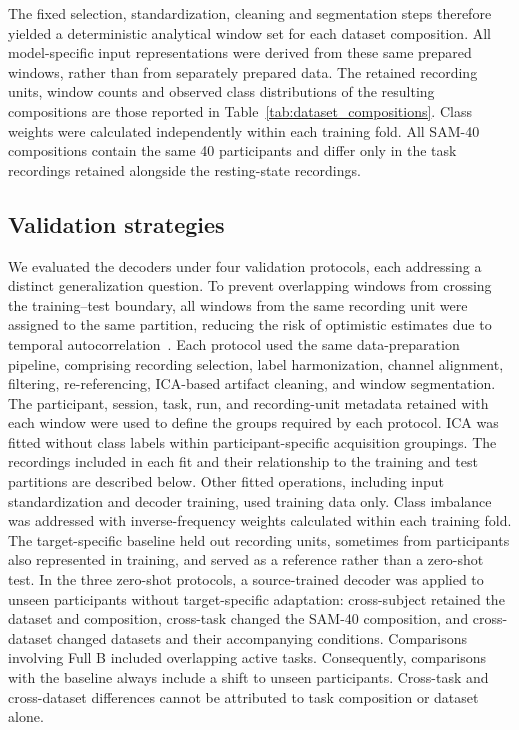 \documentclass[10pt,letterpaper]{article}
\newcommand{\rev}[1]{#1}
\newcommand{\revs}[1]{#1}
\begin{document}
\rev{The fixed selection, standardization, cleaning and segmentation steps therefore
yielded a deterministic analytical window set for each dataset composition.
All model-specific input representations were derived from these same prepared
windows, rather than from separately prepared data. The retained recording
units, window counts and observed class distributions of the resulting
compositions are those reported in Table~\ref{tab:dataset_compositions}. Class weights were calculated
independently within each training fold. All SAM-40 compositions contain the same 40 participants and
differ only in the task recordings retained alongside the resting-state
recordings.}

\subsection*{\revs{Validation strategies}}

\rev{We evaluated the decoders under four validation protocols, each addressing a distinct generalization question. To prevent overlapping windows from crossing the training--test boundary, all windows from the same recording unit were assigned to the same partition, reducing the risk of optimistic estimates due to temporal autocorrelation~\cite{chen2025hybrid}. Each protocol used the same data-preparation pipeline, comprising recording selection, label harmonization, channel alignment, filtering, re-referencing, ICA-based artifact cleaning, and window segmentation. The participant, session, task, run, and recording-unit metadata retained with each window were used to define the groups required by each protocol. ICA was fitted without class labels within participant-specific acquisition groupings. The recordings included in each fit and their relationship to the training and test partitions are described below. Other fitted operations, including input standardization and decoder training, used training data only. Class imbalance was addressed with inverse-frequency weights calculated within each training fold. The target-specific baseline held out recording units, sometimes from participants also represented in training, and served as a reference rather than a zero-shot test. In the three zero-shot protocols, a source-trained decoder was applied to unseen participants without target-specific adaptation: cross-subject retained the dataset and composition, cross-task changed the SAM-40 composition, and cross-dataset changed datasets and their accompanying conditions. Comparisons involving Full B included overlapping active tasks. Consequently, comparisons with the baseline always include a shift to unseen participants. Cross-task and cross-dataset differences cannot be attributed to task composition or dataset alone.}
\end{document}
